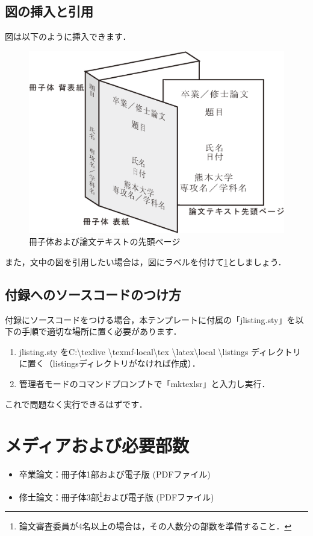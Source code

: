 \documentclass[12pt]{kupaper}
\begin{document}
\section{図の挿入と引用}
図は以下のように挿入できます．
	\begin{figure}[htbp]
		\centering
		\includegraphics[width=1.0\linewidth,keepaspectratio]{./images/book.eps}
		\caption{冊子体および論文テキストの先頭ページ}
		\label{fig:overview}
	\end{figure}

また，文中の図を引用したい場合は，図にラベルを付けて\cref{fig:overview}としましょう．

\section{付録へのソースコードのつけ方}

付録にソースコードをつける場合，本テンプレートに付属の「jlisting.sty」を以下の手順で適切な場所に置く必要があります．

	\begin{enumerate}
		\item jlisting.sty をC:\textbackslash texlive \textbackslash texmf-local\textbackslash tex \textbackslash latex\textbackslash local \textbackslash listings ディレクトリに置く（listingsディレクトリがなければ作成）．
		\item 管理者モードのコマンドプロンプトで「mktexlsr」と入力し実行．
	\end{enumerate}

これで問題なく実行できるはずです．

\chapter{メディアおよび必要部数}
	\begin{itemize}
		\item 卒業論文：冊子体1部および電子版 (PDFファイル)
		\item 修士論文：冊子体3部\footnote{論文審査委員が4名以上の場合は，その人数分の部数を準備すること．}および電子版 (PDFファイル)
	\end{itemize}
\end{document}

